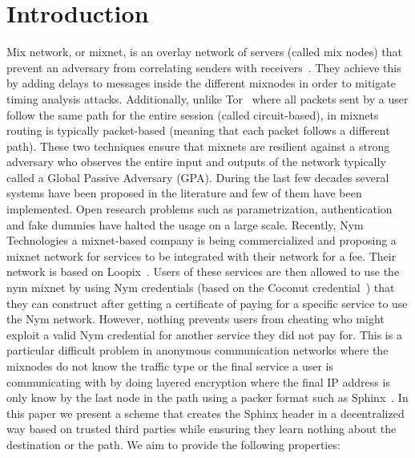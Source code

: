 \section{Introduction}

Mix network, or mixnet, is an overlay network of servers (called mix nodes) that prevent an adversary from correlating senders with receivers~\cite{chaum-mix,cypherpunk-remailer,piotrowska2017loopix,nym-network-whitepaper,danezis2003mixminion, van2015vuvuzela,mixmaster-spec,chaum2016cmix}. They achieve this by adding delays to messages inside the different mixnodes in order to mitigate timing analysis attacks. Additionally, unlike Tor~\cite{onion-routing96} where all packets sent by a user follow the same path for the entire session (called circuit-based), in mixnets routing is typically packet-based (meaning that each packet follows a different path). These two techniques ensure that mixnets are resilient against a strong adversary who observes the entire input and outputs of the network typically called a Global Passive Adversary (GPA).
During the last few decades several systems have been proposed in the literature and few of them have been implemented. Open research problems such as parametrization, authentication and fake dummies have halted the usage on a large scale. Recently, Nym Technologies a mixnet-based company is being commercialized and proposing a mixnet network for services to be integrated with their network for a fee. Their network is based on Loopix~\cite{piotrowska2017loopix}. Users of these services are then allowed to use the nym mixnet by using Nym credentials (based on the Coconut credential~\cite{coconut}) that they can construct after getting a certificate of paying for a specific service to use the Nym network. However, nothing prevents users from cheating who might exploit a valid Nym credential for another service they did not pay for. This is a particular difficult problem in anonymous communication networks where the mixnodes do not know the traffic type or the final service a user is communicating with by doing layered encryption where the final IP address is only know by the last node in the path using a packer format such as Sphinx~\cite{sphinx}. 
\newline
In this paper we present a scheme that creates the Sphinx header in a decentralized way based on trusted third parties while ensuring they learn nothing about the destination or the path. We aim to provide the following properties:
